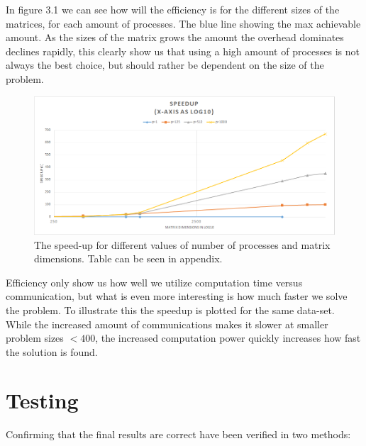 \documentclass[a4paper,11pt,oneside]{book}
\begin{document}
In figure 3.1 we can see how will the efficiency is for the different sizes of the matrices, for each amount of processes. The blue line showing the max achievable amount. As the sizes of the matrix grows the amount the overhead dominates declines rapidly, this clearly show us that using a high amount of processes is not always the best choice, but should rather be dependent on the size of the problem.

\begin{figure}[H]
  \centering
  \includegraphics[width=0.9\linewidth]{plots-speedup.png}
  \caption{The speed-up for different values of number of processes and matrix dimensions. Table can be seen in appendix.}
  \centering
  \label{fig:sub1}
\end{figure}

Efficiency only show us how well we utilize computation time versus communication, but what is even more interesting is how much faster we solve the problem. To illustrate this the speedup is plotted for the same data-set. While the increased amount of communications makes it slower at smaller problem sizes $<400$, the increased computation power quickly increases how fast the solution is found.


%
%
\chapter{Testing}
Confirming that the final results are correct have been verified in two methods:
\end{document}
